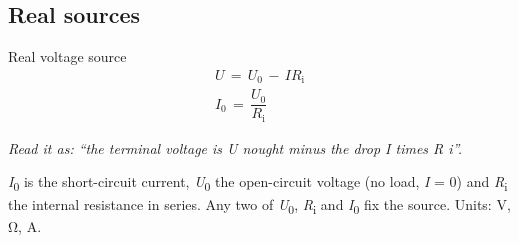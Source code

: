 \documentclass[11pt]{article}
\begin{document}
\begin{keepsection}
\begin{keepsection}
\subsection{Real sources}

\begin{equationcard}{Real voltage source}
\[ \begin{gathered} {U}\, =\, {U}_{0}\, -\, {I}{R}_{\mathrm{i}} \\ {I}_{0}\, =\, \dfrac{{U}_{0}}{{R}_{\mathrm{i}}} \end{gathered} \]
{\small \emph{Read it as: “the terminal voltage is U nought minus the drop I times R i”.}\par \textit{I}\textsubscript{0} is the short-circuit current, \textit{U}\textsubscript{0} the open-circuit voltage (no load, \textit{I} = 0) and \textit{R}\textsubscript{i} the internal resistance in series. Any two of \textit{U}\textsubscript{0}, \textit{R}\textsubscript{i} and \textit{I}\textsubscript{0} fix the source. Units: V, Ω, A.}
\end{equationcard}


\end{keepsection}
\end{keepsection}
\end{document}
